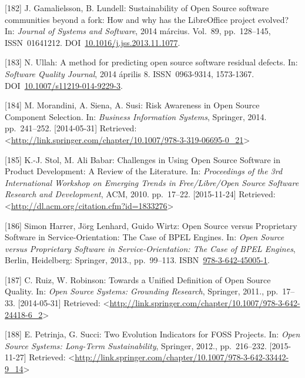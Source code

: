 \documentclass[12pt,magyar,a4paper,oneside]{scrreprt}
\begin{document}
\leavevmode\hypertarget{ref-gamalielsson_sustainability_2014}{}%
{[}182{]} J. Gamalielsson, B. Lundell: Sustainability of Open Source
software communities beyond a fork: How and why has the LibreOffice
project evolved? In: \emph{Journal of Systems and Software}, 2014
március. Vol.~89, pp.~128--145, ISSN~01641212.
DOI~\href{https://doi.org/10.1016/j.jss.2013.11.1077}{10.1016/j.jss.2013.11.1077}.

\leavevmode\hypertarget{ref-ullah_method_2014}{}%
{[}183{]} N. Ullah: A method for predicting open source software
residual defects. In: \emph{Software Quality Journal}, 2014 április 8.
ISSN~0963-9314, 1573-1367.
DOI~\href{https://doi.org/10.1007/s11219-014-9229-3}{10.1007/s11219-014-9229-3}.

\leavevmode\hypertarget{ref-morandini_risk_2014}{}%
{[}184{]} M. Morandini, A. Siena, A. Susi: Risk Awareness in Open Source
Component Selection. In: \emph{Business Information Systems}, Springer,
2014. pp.~241--252. {[}2014-05-31{]} Retrieved:
\textless{}\url{http://link.springer.com/chapter/10.1007/978-3-319-06695-0_21}\textgreater{}

\leavevmode\hypertarget{ref-stol_challenges_2010}{}%
{[}185{]} K.-J. Stol, M. Ali Babar: Challenges in Using Open Source
Software in Product Development: A Review of the Literature. In:
\emph{Proceedings of the 3rd International Workshop on Emerging Trends
in Free/Libre/Open Source Software Research and Development}, ACM, 2010.
pp.~17--22. {[}2015-11-24{]} Retrieved:
\textless{}\url{http://dl.acm.org/citation.cfm?id=1833276}\textgreater{}

\leavevmode\hypertarget{ref-simon_harrer_open_2013}{}%
{[}186{]} Simon Harrer, Jörg Lenhard, Guido Wirtz: Open Source versus
Proprietary Software in Service-Orientation: The Case of BPEL Engines.
In: \emph{Open Source versus Proprietary Software in
Service-Orientation: The Case of BPEL Engines}, Berlin, Heidelberg:
Springer, 2013., pp.~99--113.
ISBN~\href{https://worldcat.org/isbn/978-3-642-45005-1}{978-3-642-45005-1}.

\leavevmode\hypertarget{ref-ruiz_towards_2011}{}%
{[}187{]} C. Ruiz, W. Robinson: Towards a Unified Definition of Open
Source Quality. In: \emph{Open Source Systems: Grounding Research},
Springer, 2011., pp.~17--33. {[}2014-05-31{]} Retrieved:
\textless{}\url{http://link.springer.com/chapter/10.1007/978-3-642-24418-6_2}\textgreater{}

\leavevmode\hypertarget{ref-petrinja_two_2012}{}%
{[}188{]} E. Petrinja, G. Succi: Two Evolution Indicators for FOSS
Projects. In: \emph{Open Source Systems: Long-Term Sustainability},
Springer, 2012., pp.~216--232. {[}2015-11-27{]} Retrieved:
\textless{}\url{http://link.springer.com/chapter/10.1007/978-3-642-33442-9_14}\textgreater{}
\end{document}
